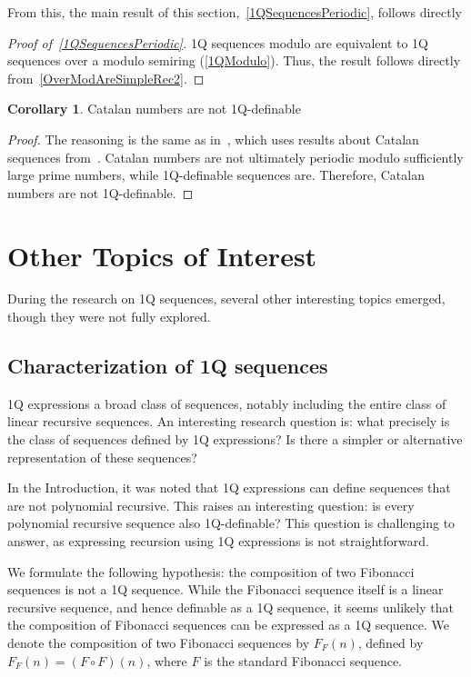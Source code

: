 \documentclass[12pt]{article}
\theoremstyle{definition}
\newtheorem{corollary}{Corollary}[section]
\begin{document}
From this, the main result of this section,~\cref{1QSequencesPeriodic}, follows directly

\begin{proof}[Proof of~\cref{1QSequencesPeriodic}]
    1Q sequences modulo are equivalent to 1Q sequences over a modulo semiring (\cref{1QModulo}). Thus, the result follows directly from~\cref{OverModAreSimpleRec2}.
\end{proof}

\begin{corollary}
    Catalan numbers are not 1Q-definable
\end{corollary}

\begin{proof}
    The reasoning is the same as in~\cite[Theorem 7, Corollary 8]{CadilhacMPPS20}, which uses results about Catalan sequences from~\cite{KubotaCatalan}. Catalan numbers are not ultimately periodic modulo sufficiently large prime numbers, while 1Q-definable sequences are. Therefore, Catalan numbers are not 1Q-definable.
\end{proof}

\section{Other Topics of Interest}
\label{SecOther}
During the research on 1Q sequences, several other interesting topics emerged, though they were not fully explored.

\subsection*{Characterization of 1Q sequences}
\label{CharacterizationOf1QSequences}
1Q expressions a broad class of sequences, notably including the entire class of linear recursive sequences. An interesting research question is: what precisely is the class of sequences defined by 1Q expressions? Is there a simpler or alternative representation of these sequences?

In the Introduction, it was noted that 1Q expressions can define sequences that are not polynomial recursive. This raises an interesting question: is every polynomial recursive sequence also 1Q-definable? This question is challenging to answer, as expressing recursion using 1Q expressions is not straightforward.

We formulate the following hypothesis: the composition of two Fibonacci sequences is not a 1Q sequence. While the Fibonacci sequence itself is a linear recursive sequence, and hence definable as a 1Q sequence, it seems unlikely that the composition of Fibonacci sequences can be expressed as a 1Q sequence. We denote the composition of two Fibonacci sequences by $F_F (n)$, defined by $F_F (n) = (F \circ F) (n)$, where $F$ is the standard Fibonacci sequence.
\end{document}
